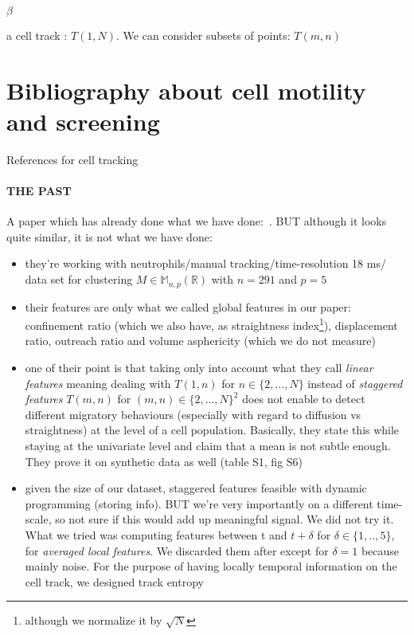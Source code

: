 \documentclass[12pt]{article}
\begin{document}
\noindent

$\beta$

a cell track : $T(1,N)$. We can consider subsets of points: $T(m,n)$
\section{Bibliography about cell motility and screening}
References for cell tracking \cite{pmid25630981}
\paragraph{THE PAST\\}
A paper which has already done what we have done:~\cite{pmid24324630}. BUT although it looks quite similar, it is not what we have done:
\begin{itemize}
\item they're working with neutrophils/manual tracking/time-resolution 18 ms/ data set for clustering $M \in \mathbb{M}_{n,p}(\mathbb{R})$ with $n=291$ and $p=5$
\item their features are only what we called global features in our paper: confinement ratio (which we also have, as straightness index\footnote{although we normalize it by $\sqrt{N}$}), displacement ratio, outreach ratio and volume asphericity (which we do not measure)
\item one of their point is that taking only into account what they call \textit{linear features} meaning dealing with $T(1,n)$ for $n \in \{2,\ldots,N\} $ instead of \textit{staggered features} $T(m,n)$ for $(m,n) \in \{2,\ldots,N\}^2 $ does not enable to detect different migratory behaviours (especially with regard to diffusion vs straightness) at the level of a cell population. Basically, they state this while staying at the univariate level and claim that a mean is not subtle enough. They prove it on synthetic data as well (table S1, fig S6)
\item given the size of our dataset, staggered features feasible with dynamic programming (storing info). BUT we're very importantly on a different time-scale, so not sure if this would add up meaningful signal. We did not try it. What we tried was computing features between t and $t+\delta$ for $\delta \in \{1,..,5\}$, for \textit{averaged local features}. We discarded them after except for $\delta =1$ because mainly noise. For the purpose of having locally temporal information on the cell track, we designed track entropy
\end{itemize}
\end{document}
